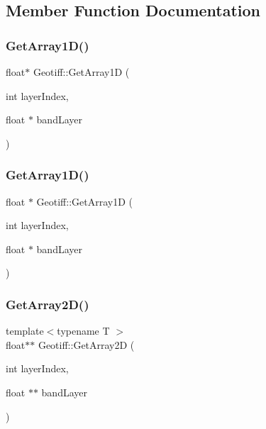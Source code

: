 \subsection{Member Function Documentation}
\mbox{\label{class_geotiff_ac00a7cbcea0623fef4bbf1764a436225}} 
\subsubsection{\texorpdfstring{Get\+Array1\+D()}{GetArray1D()}\hspace{0.1cm}{\footnotesize\ttfamily [1/2]}}
{\footnotesize\ttfamily float$\ast$ Geotiff\+::\+Get\+Array1D (\begin{DoxyParamCaption}\item[{int}]{layer\+Index,  }\item[{float $\ast$}]{band\+Layer }\end{DoxyParamCaption})}

\mbox{\label{class_geotiff_af78d2f0527b69a9706e7e55ad48f831c}} 
\subsubsection{\texorpdfstring{Get\+Array1\+D()}{GetArray1D()}\hspace{0.1cm}{\footnotesize\ttfamily [2/2]}}
{\footnotesize\ttfamily float $\ast$ Geotiff\+::\+Get\+Array1D (\begin{DoxyParamCaption}\item[{int}]{layer\+Index,  }\item[{float $\ast$}]{band\+Layer }\end{DoxyParamCaption})}

\mbox{\label{class_geotiff_a1df37e7f523a25a24ca3e5566d6cee91}} 
\subsubsection{\texorpdfstring{Get\+Array2\+D()}{GetArray2D()}\hspace{0.1cm}{\footnotesize\ttfamily [1/2]}}
{\footnotesize\ttfamily template$<$typename T $>$ \\
float$\ast$$\ast$ Geotiff\+::\+Get\+Array2D (\begin{DoxyParamCaption}\item[{int}]{layer\+Index,  }\item[{float $\ast$$\ast$}]{band\+Layer }\end{DoxyParamCaption})}

